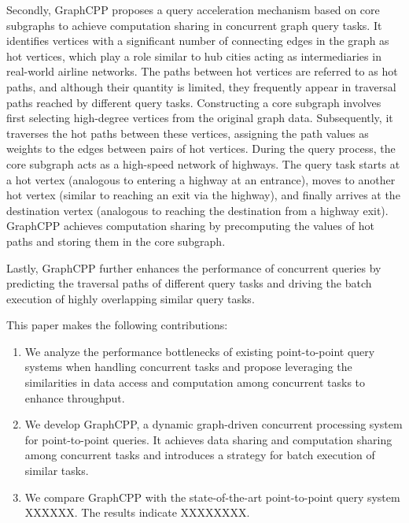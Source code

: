 \documentclass[lettersize,journal]{IEEEtran} %
\begin{document}
Secondly, GraphCPP proposes a query acceleration mechanism based on core subgraphs to achieve computation sharing in concurrent graph query tasks. It identifies vertices with a significant number of connecting edges in the graph as hot vertices, which play a role similar to hub cities acting as intermediaries in real-world airline networks. The paths between hot vertices are referred to as hot paths, and although their quantity is limited, they frequently appear in traversal paths reached by different query tasks. Constructing a core subgraph involves first selecting high-degree vertices from the original graph data. Subsequently, it traverses the hot paths between these vertices, assigning the path values as weights to the edges between pairs of hot vertices. During the query process, the core subgraph acts as a high-speed network of highways. The query task starts at a hot vertex (analogous to entering a highway at an entrance), moves to another hot vertex (similar to reaching an exit via the highway), and finally arrives at the destination vertex (analogous to reaching the destination from a highway exit). GraphCPP achieves computation sharing by precomputing the values of hot paths and storing them in the core subgraph.

Lastly, GraphCPP further enhances the performance of concurrent queries by predicting the traversal paths of different query tasks and driving the batch execution of highly overlapping similar query tasks.

This paper makes the following contributions:
\begin{enumerate}
  \item{We analyze the performance bottlenecks of existing point-to-point query systems when handling concurrent tasks and propose leveraging the similarities in data access and computation among concurrent tasks to enhance throughput.}
  \item{We develop GraphCPP, a dynamic graph-driven concurrent processing system for point-to-point queries. It achieves data sharing and computation sharing among concurrent tasks and introduces a strategy for batch execution of similar tasks.}
  \item{We compare GraphCPP with the state-of-the-art point-to-point query system XXXXXX. The results indicate XXXXXXXX.}
\end{enumerate}
\end{document}
